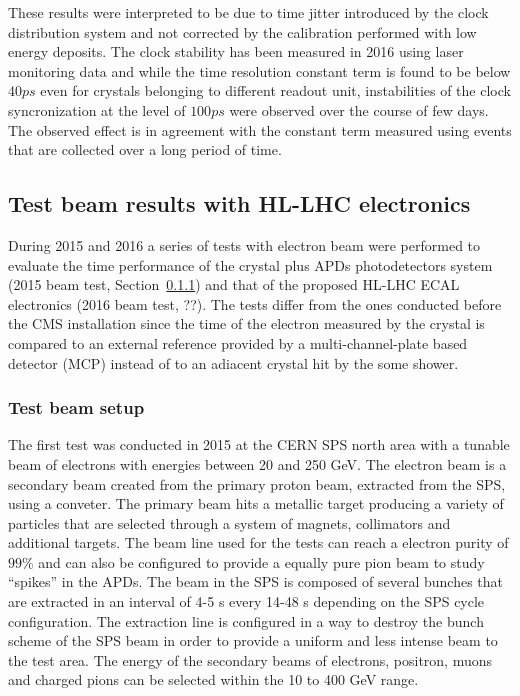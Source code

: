 These results were interpreted to be due to time jitter introduced by the clock distribution system and not corrected by
the calibration performed with low energy deposits. The clock stability has been measured in 2016 using laser monitoring data
and while the time resolution constant term is found to be below $40 ps$ even for crystals belonging to different readout unit,
instabilities of the clock syncronization at the level of $100 ps$ were observed over the course of few days. The
observed effect is in agreement with the constant term measured using \Zee events that are collected over a long period of time.

\subsection{Test beam results with HL-LHC electronics}
During 2015 and 2016 a series of tests with electron beam were performed to evaluate the time performance
of the \PbWO crystal plus APDs photodetectors system (2015 beam test, Section~\ref{sec:tb_2015})
and that of the proposed HL-LHC ECAL electronics (2016 beam test, ??).
The tests differ from the ones conducted before the CMS installation since the time of the electron measured by the
crystal is compared to an external reference provided by a multi-channel-plate based detector (MCP) instead of to an adiacent
crystal hit by the some shower.

\subsubsection{Test beam setup}
\label{sec:tb_2015}
The first test was conducted in 2015 at the CERN SPS north area with a tunable beam of electrons with energies between 20 and 250 GeV.
The electron beam is a secondary beam created from the primary proton beam, extracted from the SPS, using a conveter.
The primary beam hits a metallic target producing a variety of particles that are selected through a system of magnets, collimators
and additional targets. The beam line used for the tests can reach a electron purity of $99\%$ and can also be
configured to provide a equally pure pion beam to study ``spikes'' in the APDs.
The beam in the SPS is composed of several bunches that are extracted in an interval of 4-5 s every 14-48 s depending on the
SPS cycle configuration. The extraction line is configured in a way to destroy the bunch scheme of the SPS beam in order
to provide a uniform and less intense beam to the test area.
The energy of the secondary beams of electrons, positron, muons and charged pions can be selected within the 10 to 400 GeV
range. 

